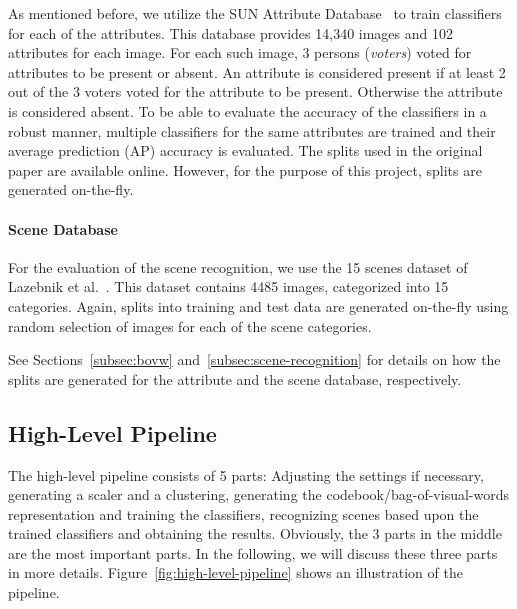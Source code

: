 \documentclass{vldb}
\begin{document}
As mentioned before, we utilize the SUN Attribute Database~\cite{Patterson:2012}
to train classifiers for each of the attributes. This database provides 14,340
images and 102 attributes for each image. For each such image, 3 persons
(\emph{voters}) voted for attributes to be present or absent. An attribute is
considered present if at least 2 out of the 3 voters voted for the attribute to
be present. Otherwise the attribute is considered absent. To be able to evaluate
the accuracy of the classifiers in a robust manner, multiple classifiers for the
same attributes are trained and their average prediction (AP) accuracy is evaluated.
The splits used in the original paper are available online. However, for the
purpose of this project, splits are generated on-the-fly.

\paragraph*{Scene Database}
\label{par:scene-database}

For the evaluation of the scene recognition, we use the 15 scenes dataset of
Lazebnik et al.~\cite{Lazebnik:2006}. This dataset contains 4485 images,
categorized into 15 categories. Again, splits into training and test data are
generated on-the-fly using random selection of images for each of the scene
categories. 

See Sections~\ref{subsec:bovw} and~\ref{subsec:scene-recognition} for details on
how the splits are generated for the attribute and the scene database,
respectively.

\clearpage

\subsection{High-Level Pipeline}
\label{subsec:high-level-pipeline}

The high-level pipeline consists of 5 parts: Adjusting the settings if necessary,
generating a scaler and a clustering, generating the codebook/bag-of-visual-words
representation and training the classifiers, recognizing scenes based upon the
trained classifiers and obtaining the results. Obviously, the 3 parts in the
middle are the most important parts. In the following, we will discuss these three
parts in more details. Figure~\ref{fig:high-level-pipeline} shows an illustration
of the pipeline.
\end{document}
